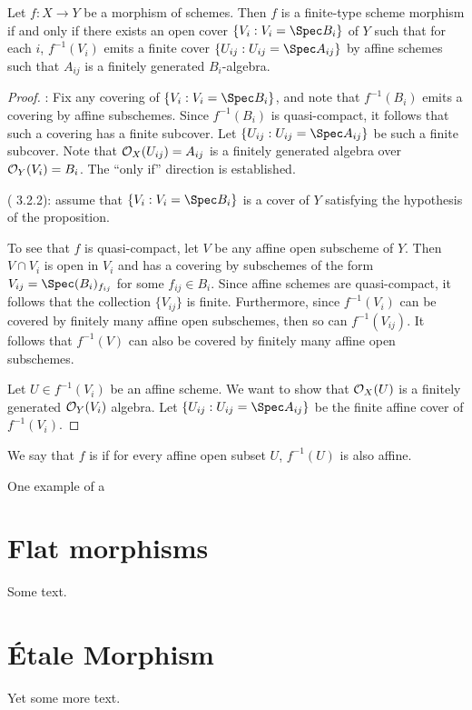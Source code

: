 \begin{prop}
Let $f: X \to Y$ be a morphism of schemes. Then $f$ is a 
finite-type scheme morphism if and only if there exists an open 
cover $\{V_i : V_i = \Spec B_i \}$ of $Y$ such that for each $i$, 
$f^{-1}(V_i)$ emits a finite cover $\{U_{ij} : U_{ij} = \Spec 
A_{ij}\}$ by affine schemes such that $A_{ij}$ is a finitely 
generated $B_i$-algebra.
\end{prop}
\begin{proof}
\pfitem{$\Rightarrow$}: Fix any covering of $\{V_i : V_i = \Spec 
B_i\}$, and note that $f^{-1}(B_i)$ emits a covering by affine
subschemes. Since $f^{-1}(B_i)$ is quasi-compact, it follows that
such a covering has a finite subcover. Let $\{U_{ij} : U_{ij} = 
\Spec A_{ij}\}$ be such a finite subcover. Note that $\mathcal{O}_X(U_{ij}) 
= A_{ij}$ is a finitely generated algebra over $\mathcal{O}_Y(V_i) = B_i$.
The ``only if'' direction is established.

\pfitem{$\Leftarrow$} (\cite{Liu} 3.2.2): assume that $\{V_i :
V_i = \Spec B_i\}$ is a cover of $Y$ satisfying the hypothesis
of the proposition.

To see that $f$ is quasi-compact, let $V$ be any affine open 
subscheme of $Y$. Then $V \cap V_i$ is open in $V_i$ and has a
covering by subschemes of the form $V_{ij} = \Spec (B_i)_{f_{ij}}$ 
for some $f_{ij} \in B_i$. Since affine schemes are quasi-compact,
it follows that the collection $\{V_{ij}\}$ is finite. 
Furthermore, since $f^{-1}(V_i)$ can be covered by finitely many 
affine open subschemes, then so can $f^{-1}(V_{ij})$. It follows 
that $f^{-1}(V)$ can also be covered by finitely many affine open
subschemes.

Let $U \in f^{-1}(V_i)$ be an affine scheme. We want to show that
$\mathcal{O}_X(U)$ is a finitely generated $\mathcal{O}_Y(V_i)$ algebra. Let 
$\{U_{ij} : U_{ij} = \Spec A_{ij}\}$ be the finite affine cover of 
$f^{-1}(V_i)$.
\end{proof}

\begin{defn}
We say that $f$ is  if for every 
affine open subset $U$, $f^{-1}(U)$ is also affine. 
\end{defn}

One example of a 

\section{Flat morphisms}

Some text.

\section{\'Etale Morphism}

Yet some more text.
